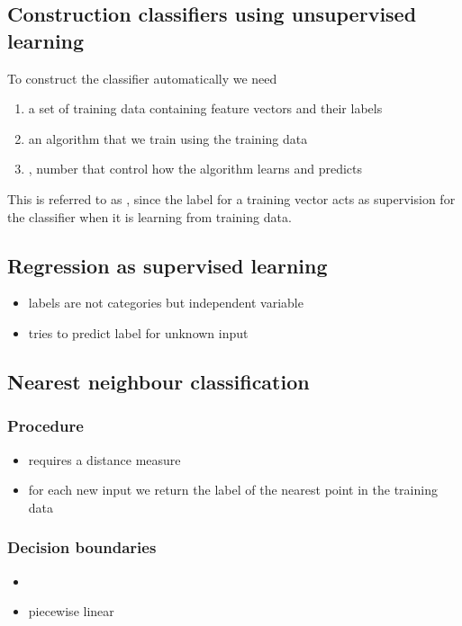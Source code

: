 \documentclass{article}
\begin{document}
\subsection{Construction classifiers using unsupervised learning}


To construct the classifier automatically we need
\begin{enumerate}
	\item a set of training data containing feature vectors and their labels
	\item an algorithm that we train using the training data
	\item {}, number that control how the algorithm learns and predicts
\end{enumerate}
This is referred to as , since the label for a training
vector acts as supervision for the classifier when it is learning from
training data.


\subsection{Regression as supervised learning}


\begin{itemize}
	\item labels are not categories but independent variable
	\item tries to predict label for unknown input
\end{itemize}


\subsection{Nearest neighbour classification}


\subsubsection{Procedure}

\begin{itemize}
	\item requires a distance measure
	\item for each new input we return the label of the nearest point in the training data
\end{itemize}

\subsubsection{Decision boundaries}
\begin{itemize}
	\item {}
	\item piecewise linear
\end{itemize}
\end{document}
